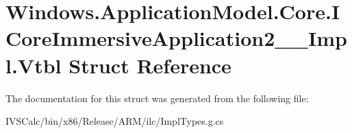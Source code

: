 \hypertarget{struct_windows_1_1_application_model_1_1_core_1_1_i_core_immersive_application2_____impl_1_1_vtbl}{}\section{Windows.\+Application\+Model.\+Core.\+I\+Core\+Immersive\+Application2\+\_\+\+\_\+\+Impl.\+Vtbl Struct Reference}
\label{struct_windows_1_1_application_model_1_1_core_1_1_i_core_immersive_application2_____impl_1_1_vtbl}


The documentation for this struct was generated from the following file\+:\begin{DoxyCompactItemize}
\item 
I\+V\+S\+Calc/bin/x86/\+Release/\+A\+R\+M/ilc/Impl\+Types.\+g.\+cs\end{DoxyCompactItemize}
